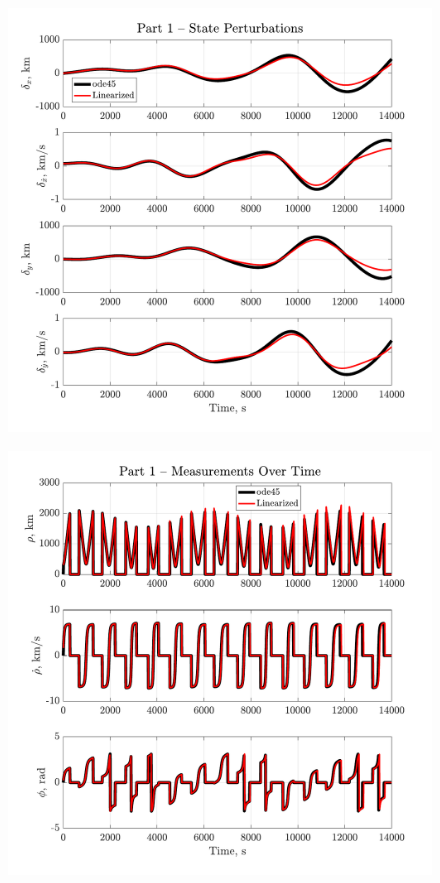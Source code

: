 \documentclass[a4paper]{aiaa-tc}
\begin{document}
 \begin{figure}[H]
 \centering
 \includegraphics[width=\textwidth]{Figures/Part1_residuals.pdf}
 \end{figure}
 
 \begin{figure}[H]
 \centering
 \includegraphics[width=\textwidth]{Figures/Part1_measurements.pdf}
 \end{figure}
 
\end{document}
